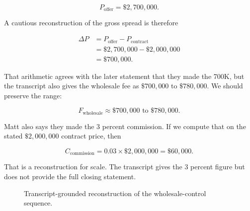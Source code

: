 \begin{equation}
P_{\text{offer}}=\$2{,}700{,}000.
\end{equation}

A cautious reconstruction of the gross spread is therefore

\begin{align}
\Delta P
  &=P_{\text{offer}}-P_{\text{contract}}\\
  &=\$2{,}700{,}000-\$2{,}000{,}000\\
  &=\$700{,}000.
\end{align}

That arithmetic agrees with the later statement that they made the 700K, but the transcript also gives the wholesale fee as \(\$700{,}000\) to \(\$780{,}000\). We should preserve the range:

\begin{equation}
F_{\text{wholesale}}
\approx
\$700{,}000\text{ to }\$780{,}000.
\end{equation}

Matt also says they made the 3 percent commission. If we compute that on the stated \(\$2{,}000{,}000\) contract price, then

\begin{equation}
C_{\text{commission}}
=
0.03 \times \$2{,}000{,}000
=
\$60{,}000.
\end{equation}

That is a reconstruction for scale. The transcript gives the 3 percent figure but does not provide the full closing statement.

\begin{figure}
\centering
{}
\caption{Transcript-grounded reconstruction of the wholesale-control sequence.}
\end{figure}


